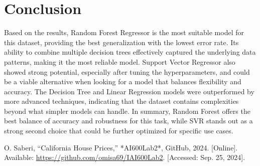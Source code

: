 \documentclass[conference]{IEEEtran}
\begin{document}
\section{Conclusion}
Based on the results, Random Forest Regressor is the most suitable model for this dataset, providing the best generalization with the lowest error rate. Its ability to combine multiple decision trees effectively captured the underlying data patterns, making it the most reliable model. Support Vector Regressor also showed strong potential, especially after tuning the hyperparameters, and could be a viable alternative when looking for a model that balances flexibility and accuracy. The Decision Tree and Linear Regression models were outperformed by more advanced techniques, indicating that the dataset contains complexities beyond what simpler models can handle. In summary, Random Forest offers the best balance of accuracy and robustness for this task, while SVR stands out as a strong second choice that could be further optimized for specific use cases.

\begin{thebibliography}{00}
 O. Saberi, ``California House Prices,'' *AI600Lab2*, GitHub, 2024. [Online]. Available: \url{https://github.com/omisa69/IAI600Lab2}. [Accessed: Sep. 25, 2024].

\end{thebibliography}
\end{document}
